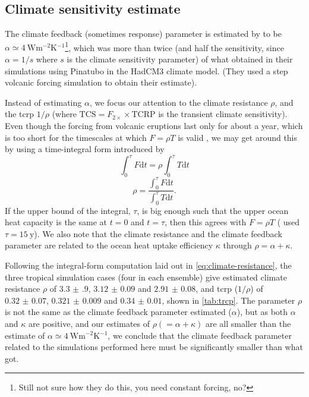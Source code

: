 \documentclass{ametsocV5}
\begin{document}
\subsection{Climate sensitivity estimate}

The climate feedback (sometimes response) parameter is estimated by \citet{jones2005} to
be \(\alpha \simeq \SI{4}{\watt\metre^{-2}\kelvin^{-1}}\)\footnote{Still not sure how
  they do this, you need constant forcing, no?}, which was more than twice (and half the
sensitivity, since \(\alpha =1/s\) where \(s\) is the climate sensitivity parameter) of
what \citet{gregory2016} obtained in their simulations using Pinatubo in the HadCM3
climate model. (They used a step volcanic forcing simulation to obtain their estimate).

Instead of estimating \(\alpha \), we focus our attention to the climate resistance
\(\rho \), and the \ac{tcrp} \(1/\rho\) (where \(\mathrm{TCS}=F_{2\times}\times
\mathrm{TCRP}\) is the transient climate sensitivity). Even though the forcing from
volcanic eruptions last only for about a year, which is too short for the timescales at
which \(F=\rho T\) is valid \citep{gregory2016}, we may get around this by using a
time-integral form introduced by \citet{merlis2014}
\begin{equation}
  \int_0^{\tau}F \mathrm{d}t=\rho\int_{0}^{\tau}T \mathrm{d}t
\end{equation}
\begin{equation}
  \rho=\frac{\int_0^{\tau}F \mathrm{d}t}{\int_{0}^{\tau}T \mathrm{d}t}.
  \label{eq:climate-resistance}
\end{equation}
%
If the upper bound of the integral, \(\tau \), is big enough such that the upper ocean
heat capacity is the same at \(t=0\) and \(t=\tau \), then this agrees with \(F=\rho T\)
\citep{gregory2016} (\citet{merlis2014} used \(\tau =\SI{15}{\mathrm{y}}\)). We also
note that the climate resistance and the climate feedback parameter are related to the
ocean heat uptake efficiency \(\kappa \) through \(\rho =\alpha +\kappa \).

Following the integral-form computation laid out in \cref{eq:climate-resistance}, the
three tropical simulation cases (four in each ensemble) give estimated climate
resistance \(\rho \) of \(\num{3.3(9)}\), \(\num{3.12(9)}\) and \(\num{2.91(8)}\), and
\ac{tcrp} (\(1/\rho\)) of \(\num{0.32(7)}\), \(\num{0.321(9)}\) and \(\num{0.34(1)}\),
shown in \cref{tab:trcp}. The parameter \(\rho\) is not the same as the climate feedback
parameter \citet{jones2005} estimated (\(\alpha\)), but as both \(\alpha \) and \(\kappa
\) are positive, and our estimates of \(\rho (=\alpha +\kappa) \) are all smaller than
the \citet{jones2005} estimate of \(\alpha \simeq
\SI{4}{\watt\metre^{-2}\kelvin^{-1}}\), we conclude that the climate feedback parameter
related to the simulations performed here must be significantly smaller than what
\citet{jones2005} got.
\end{document}
